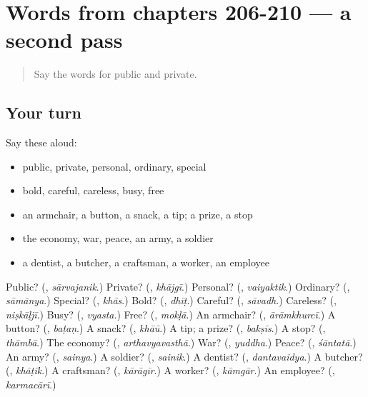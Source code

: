 \section[(dialogue)]{Words from chapters 206-210 — a second pass}

\label{lesson:MR-R210-second-pass-words-from-chapters-206-210}



\begin{quote}
Say the words for public and private.
\end{quote}

\subsection*{Your turn}
Say these aloud:

\begin{itemize}
\raggedright
  \item public, private, personal, ordinary, special
  \item bold, careful, careless, busy, free
  \item an armchair, a button, a snack, a tip; a prize, a stop
  \item the economy, war, peace, an army, a soldier
  \item a dentist, a butcher, a craftsman, a worker, an employee
\end{itemize}

\begin{tcolorbox}[breakable,colback=teal!4,colframe=teal!35!black,title={Before you move on}]
Public? (\textbf{}, \emph{sārvajanik}.) Private? (\textbf{}, \emph{khājgī}.) Personal? (\textbf{}, \emph{vaiyaktik}.) Ordinary? (\textbf{}, \emph{sāmānya}.) Special? (\textbf{}, \emph{khās}.) Bold? (\textbf{}, \emph{dhīṭ}.) Careful? (\textbf{}, \emph{sāvadh}.) Careless? (\textbf{}, \emph{niṣkāḷjī}.) Busy? (\textbf{}, \emph{vyasta}.) Free? (\textbf{}, \emph{mokḷā}.) An armchair? (\textbf{}, \emph{ārāmkhurcī}.) A button? (\textbf{}, \emph{baṭaṇ}.) A snack? (\textbf{}, \emph{khāū}.) A tip; a prize? (\textbf{}, \emph{bakṣīs}.) A stop? (\textbf{}, \emph{thāmbā}.) The economy? (\textbf{}, \emph{arthavyavasthā}.) War? (\textbf{}, \emph{yuddha}.) Peace? (\textbf{}, \emph{śāntatā}.) An army? (\textbf{}, \emph{sainya}.) A soldier? (\textbf{}, \emph{sainik}.) A dentist? (\textbf{}, \emph{dantavaidya}.) A butcher? (\textbf{}, \emph{khāṭīk}.) A craftsman? (\textbf{}, \emph{kārāgīr}.) A worker? (\textbf{}, \emph{kāmgār}.) An employee? (\textbf{}, \emph{karmacārī}.)
\end{tcolorbox}
